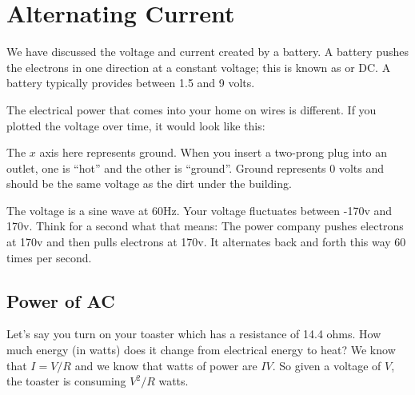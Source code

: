 \chapter{Alternating Current}

We have discussed the voltage and current created by a battery.  A
battery pushes the electrons in one direction at a constant voltage;
this is known as  or DC. A battery typically
provides between 1.5 and 9 volts.

The electrical power that comes into your home on wires is
different. If you plotted the voltage over time, it would look like
this:


The $x$ axis here represents ground. When you insert a two-prong plug
into an outlet, one is ``hot'' and the other is ``ground''. Ground
represents 0 volts and should be the same voltage as the dirt under
the building.

The voltage is a sine wave at 60Hz. Your voltage fluctuates between
-170v and 170v. Think for a second what that means: The power company
pushes electrons at 170v and then pulls electrons at 170v.  It
alternates back and forth this way 60 times per second.

\section{Power of AC}

Let's say you turn on your toaster which has a resistance of 14.4
ohms. How much energy (in watts) does it change from electrical energy
to heat?  We know that $I = V/R$ and we know that watts of power are
$IV$. So given a voltage of $V$, the toaster is consuming $V^2/R$
watts.

